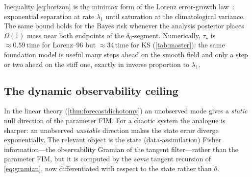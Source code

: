 \documentclass[10pt]{article}
\theoremstyle{plain}
\theoremstyle{definition}
\theoremstyle{remark}
\begin{document}
\begin{remark}
Inequality \eqref{eq:horizon} is the minimax form of the Lorenz error-growth
law~\cite{lorenz1963}: exponential separation at rate $\lambda_1$ until saturation
at the climatological variance. The same bound holds for the Bayes risk whenever
the analysis posterior places $\Omega(1)$ mass near both endpoints of the
$\delta_0$-segment. Numerically, $\tau_\star$ is $\approx0.59\,\mathrm{time}$ for
Lorenz--96 but $\approx34\,\mathrm{time}$ for KS (\cref{tab:master}): the same
foundation model is useful many steps ahead on the smooth field and only a step
or two ahead on the stiff one, exactly in inverse proportion to $\lambda_1$.
\end{remark}

\subsection{The dynamic observability ceiling}
In the linear theory (\cref{thm:forecastdichotomy}) an unobserved mode gives a
\emph{static} null direction of the parameter FIM. For a chaotic system the
analogue is sharper: an unobserved \emph{unstable} direction makes the state error
diverge exponentially. The relevant object is the state (data-assimilation) Fisher
information---the observability Gramian of the tangent filter---rather than the
parameter FIM, but it is computed by the \emph{same} tangent recursion of
\eqref{eq:gramian}, now differentiated with respect to the state rather than
$\theta$.
\end{document}
